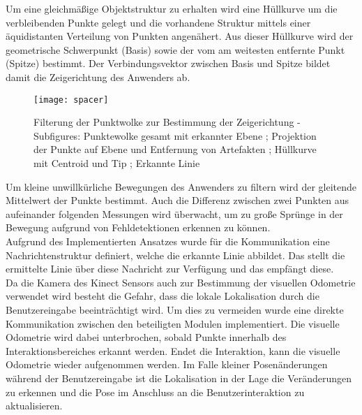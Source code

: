 Um eine gleichmäßige Objektstruktur zu erhalten wird eine Hüllkurve um die verbleibenden Punkte gelegt und die vorhandene Struktur mittels einer äquidistanten Verteilung von Punkten angenähert. Aus dieser Hüllkurve wird der geometrische Schwerpunkt (Basis) sowie der vom \kps{} am weitesten entfernte Punkt (Spitze) bestimmt. Der Verbindungsvektor zwischen Basis und Spitze bildet damit die Zeigerichtung des Anwenders ab.\\

\begin{figure}[!ht]
	\begin{center}
		\texttt{[image: spacer]}
		\caption{Filterung der Punktwolke zur Bestimmung der Zeigerichtung - Subfigures: Punktewolke gesamt mit erkannter Ebene ; Projektion der Punkte auf Ebene und Entfernung von Artefakten ; Hüllkurve mit Centroid und Tip ; Erkannte Linie}
		\label{fig.intdir}
	\end{center}
\end{figure}

Um kleine unwillkürliche Bewegungen des Anwenders zu filtern wird der gleitende Mittelwert der Punkte bestimmt. Auch die Differenz zwischen zwei Punkten aus aufeinander folgenden Messungen wird überwacht, um zu große Sprünge in der Bewegung aufgrund von Fehldetektionen erkennen zu können.\\
Aufgrund des Implementierten Ansatzes wurde für die Kommunikation eine Nachrichtenstruktur definiert, welche die erkannte Linie abbildet. Das \mInteraction stellt die ermittelte Linie über diese Nachricht zur Verfügung und das \red[\mVisualization ?] empfängt diese.\\

Da die Kamera des Kinect Sensors auch zur Bestimmung der visuellen Odometrie verwendet wird besteht die Gefahr, dass die lokale Lokalisation durch die Benutzereingabe beeinträchtigt wird. Um dies zu vermeiden wurde eine direkte Kommunikation zwischen den beteiligten Modulen implementiert. Die visuelle Odometrie wird dabei unterbrochen, sobald Punkte innerhalb des Interaktionsbereiches erkannt werden. Endet die Interaktion, kann die visuelle Odometrie wieder aufgenommen werden.
Im Falle kleiner Posenänderungen während der Benutzereingabe ist die Lokalisation in der Lage die Veränderungen zu erkennen und die Pose im Anschluss an die Benutzerinteraktion zu aktualisieren.

